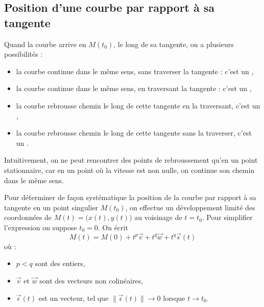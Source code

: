 \documentclass[class=report,crop=false]{standalone}
\begin{document}
\subsection{Position d'une courbe par rapport à sa tangente}


Quand la courbe arrive en $M(t_0)$, le long de sa tangente, on a
plusieurs possibilités :
\begin{itemize}
  \item la courbe continue dans le même sens, sans traverser la tangente :
  c'est un ,

  \item la courbe continue dans le même sens, en traversant la tangente :
  c'est un ,

  \item la courbe rebrousse chemin le long de
cette tangente en la traversant, c'est un
,

  \item la courbe rebrousse chemin le long de
cette tangente sans la traverser, c'est un
.

\end{itemize}


Intuitivement, on ne peut rencontrer des points de rebroussement qu'en
un point stationnaire, car en un point où la vitesse est non nulle,
on continue son chemin dans le même sens.

\bigskip

Pour déterminer de façon systématique la position de la courbe par rapport à sa tangente
en un point singulier $M(t_0)$,
on effectue un développement limité des coordonnées de $M(t) = \big(x(t),y(t)\big)$
au voisinage de $t=t_0$.
Pour simplifier l'expression on suppose $t_0=0$.
On écrit
$$M(t) = M(0) + t^p \vec{v} + t^q \vec{w} +t^q \vec{\epsilon}(t)$$
où :
\begin{itemize}
  \item $p<q$ sont des entiers,
  \item $\vec{v}$ et $\vec{w}$ sont des vecteurs non colinéaires,
  \item $\vec{\epsilon}(t)$ est un vecteur, tel que $\|\vec{\epsilon}(t)\| \to 0$
  lorsque $t\to t_0$.
\end{itemize}
\end{document}
